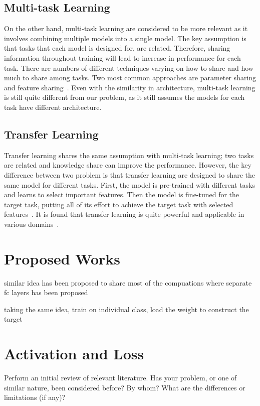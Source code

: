 \documentclass{article}
\begin{document}
\subsection{Multi-task Learning}
On the other hand, multi-task learning are considered to be more relevant as it involves combining multiple models into a single model. The key assumption is that tasks that each model is designed for, are related. Therefore, sharing information throughout training will lead to increase in performance for each task. There are numbers of different techniques varying on how to share and how much to share among tasks. Two most common approaches are parameter sharing and feature sharing~\cite{ruder2017overview, Caruana1993MultitaskLA, duong2015low, lu2017fully}. Even with the similarity in architecture, multi-task learning is still quite different from our problem, as it still assumes the models for each task have different architecture.

\subsection{Transfer Learning}

Transfer learning shares the same assumption with multi-task learning; two tasks are related and knowledge share can improve the performance. However, the key difference between two problem is that transfer learning are designed to share the same model for different tasks. First, the model is pre-trained with different tasks and learns to select important features. Then the model is fine-tuned for the target task, putting all of its effort to achieve the target task with selected features~\cite{yosinski2014transferable}. It is found that transfer learning is quite powerful and applicable in various domains~\cite{raina2007self, egan2004effects, glorot2011domain}.

\section{Proposed Works}

similar idea has been proposed to share most of the compuations where separate fc layers has been proposed

taking the same idea, train on individual class, load the weight to construct the target



\section{Activation and Loss}
Perform an initial review of relevant literature. Has your problem, or one of similar nature, been considered before? By whom? What are the differences or limitations (if any)?
\end{document}
